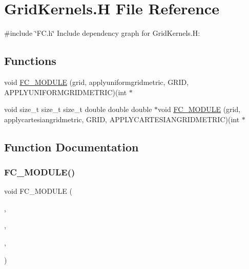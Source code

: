 \hypertarget{GridKernels_8H}{}\section{Grid\+Kernels.\+H File Reference}
\label{GridKernels_8H}
{\ttfamily \#include \char`\"{}F\+C.\+h\char`\"{}}\newline
Include dependency graph for Grid\+Kernels.\+H\+:
\subsection*{Functions}
\begin{DoxyCompactItemize}
\item 
void \hyperlink{GridKernels_8H_ab0cb63dc19bfa3e3df61c7f7a1831ed6}{F\+C\+\_\+\+M\+O\+D\+U\+LE} (grid, applyuniformgridmetric, G\+R\+ID, A\+P\+P\+L\+Y\+U\+N\+I\+F\+O\+R\+M\+G\+R\+I\+D\+M\+E\+T\+R\+IC)(int $\ast$
\item 
void size\+\_\+t size\+\_\+t size\+\_\+t double double double $\ast$void \hyperlink{GridKernels_8H_a81014fabdd26df2572b014cef7635cce}{F\+C\+\_\+\+M\+O\+D\+U\+LE} (grid, applycartesiangridmetric, G\+R\+ID, A\+P\+P\+L\+Y\+C\+A\+R\+T\+E\+S\+I\+A\+N\+G\+R\+I\+D\+M\+E\+T\+R\+IC)(int $\ast$
\end{DoxyCompactItemize}


\subsection{Function Documentation}
\hypertarget{GridKernels_8H_ab0cb63dc19bfa3e3df61c7f7a1831ed6}{}\label{GridKernels_8H_ab0cb63dc19bfa3e3df61c7f7a1831ed6} 
\subsubsection{\texorpdfstring{F\+C\+\_\+\+M\+O\+D\+U\+L\+E()}{FC\_MODULE()}\hspace{0.1cm}{\footnotesize\ttfamily [1/2]}}
{\footnotesize\ttfamily void F\+C\+\_\+\+M\+O\+D\+U\+LE (\begin{DoxyParamCaption}\item[{grid}]{,  }\item[{applyuniformgridmetric}]{,  }\item[{G\+R\+ID}]{,  }\item[{A\+P\+P\+L\+Y\+U\+N\+I\+F\+O\+R\+M\+G\+R\+I\+D\+M\+E\+T\+R\+IC}]{ }\end{DoxyParamCaption})}

